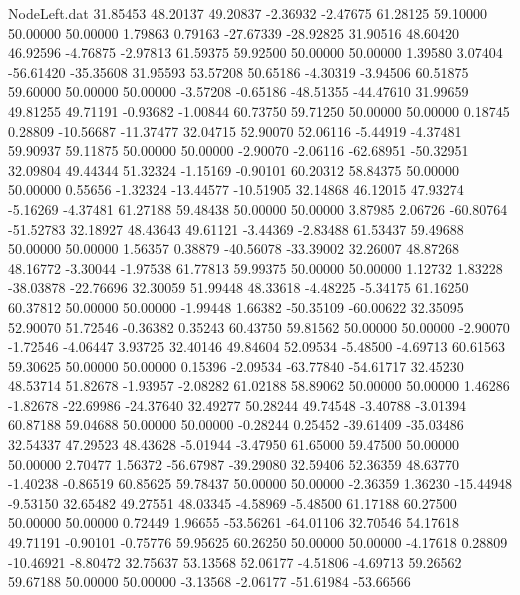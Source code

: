 \begin{filecontents}{NodeLeft.dat}
  31.85453   48.20137   49.20837    -2.36932   -2.47675   61.28125   59.10000   50.00000   50.00000    1.79863    0.79163  -27.67339  -28.92825
  31.90516   48.60420   46.92596    -4.76875   -2.97813   61.59375   59.92500   50.00000   50.00000    1.39580    3.07404  -56.61420  -35.35608
  31.95593   53.57208   50.65186    -4.30319   -3.94506   60.51875   59.60000   50.00000   50.00000   -3.57208   -0.65186  -48.51355  -44.47610
  31.99659   49.81255   49.71191    -0.93682   -1.00844   60.73750   59.71250   50.00000   50.00000    0.18745    0.28809  -10.56687  -11.37477
  32.04715   52.90070   52.06116    -5.44919   -4.37481   59.90937   59.11875   50.00000   50.00000   -2.90070   -2.06116  -62.68951  -50.32951
  32.09804   49.44344   51.32324    -1.15169   -0.90101   60.20312   58.84375   50.00000   50.00000    0.55656   -1.32324  -13.44577  -10.51905
  32.14868   46.12015   47.93274    -5.16269   -4.37481   61.27188   59.48438   50.00000   50.00000    3.87985    2.06726  -60.80764  -51.52783
  32.18927   48.43643   49.61121    -3.44369   -2.83488   61.53437   59.49688   50.00000   50.00000    1.56357    0.38879  -40.56078  -33.39002
  32.26007   48.87268   48.16772    -3.30044   -1.97538   61.77813   59.99375   50.00000   50.00000    1.12732    1.83228  -38.03878  -22.76696
  32.30059   51.99448   48.33618    -4.48225   -5.34175   61.16250   60.37812   50.00000   50.00000   -1.99448    1.66382  -50.35109  -60.00622
  32.35095   52.90070   51.72546    -0.36382    0.35243   60.43750   59.81562   50.00000   50.00000   -2.90070   -1.72546   -4.06447    3.93725
  32.40146   49.84604   52.09534    -5.48500   -4.69713   60.61563   59.30625   50.00000   50.00000    0.15396   -2.09534  -63.77840  -54.61717
  32.45230   48.53714   51.82678    -1.93957   -2.08282   61.02188   58.89062   50.00000   50.00000    1.46286   -1.82678  -22.69986  -24.37640
  32.49277   50.28244   49.74548    -3.40788   -3.01394   60.87188   59.04688   50.00000   50.00000   -0.28244    0.25452  -39.61409  -35.03486
  32.54337   47.29523   48.43628    -5.01944   -3.47950   61.65000   59.47500   50.00000   50.00000    2.70477    1.56372  -56.67987  -39.29080
  32.59406   52.36359   48.63770    -1.40238   -0.86519   60.85625   59.78437   50.00000   50.00000   -2.36359    1.36230  -15.44948   -9.53150
  32.65482   49.27551   48.03345    -4.58969   -5.48500   61.17188   60.27500   50.00000   50.00000    0.72449    1.96655  -53.56261  -64.01106
  32.70546   54.17618   49.71191    -0.90101   -0.75776   59.95625   60.26250   50.00000   50.00000   -4.17618    0.28809  -10.46921   -8.80472
  32.75637   53.13568   52.06177    -4.51806   -4.69713   59.26562   59.67188   50.00000   50.00000   -3.13568   -2.06177  -51.61984  -53.66566

\end{filecontents}
